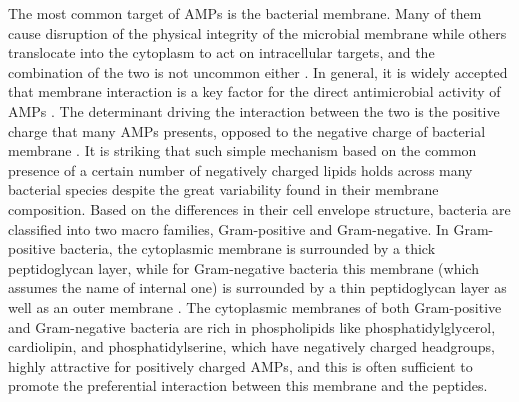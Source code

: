 The most common target of AMPs is the bacterial membrane. Many of them cause disruption of the physical integrity of the microbial membrane while others translocate into the cytoplasm to act on intracellular targets, and the combination of the two is not uncommon either \cite{Hancock2006}. In general, it is widely accepted that membrane interaction is a key factor for the direct antimicrobial activity of AMPs \cite{Nguyen2011,Malmsten2016}.
%
The determinant driving the interaction between the two is the positive charge that many AMPs presents, opposed to the negative charge of bacterial membrane \cite{Zhang2001,Schmitt2016}.
%
It is striking that such simple mechanism based on the common presence of a certain number of negatively charged lipids holds across many bacterial species despite the great variability found in their membrane composition.
%
Based on the differences in their cell envelope structure, bacteria are classified into two macro families, Gram-positive and Gram-negative. In Gram-positive bacteria, the cytoplasmic membrane is surrounded by a thick peptidoglycan layer, while for Gram-negative bacteria this membrane (which assumes the name of internal one) is surrounded by a thin peptidoglycan layer as well as an outer membrane \cite{Lin2016}.
%
The cytoplasmic membranes of both Gram-positive and Gram-negative bacteria are rich in phospholipids like phosphatidylglycerol, cardiolipin, and phosphatidylserine, which have negatively charged headgroups, highly attractive for positively charged AMPs, and this is often sufficient to promote the preferential interaction between this membrane and the peptides.

